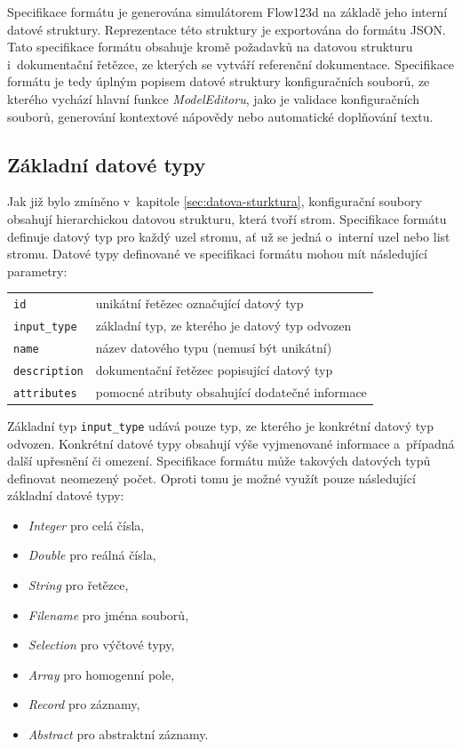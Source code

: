 \documentclass[FM,bw,DP]{tulthesis}
\begin{document}
Specifikace formátu je generována simulátorem Flow123d na základě jeho interní datové struktury. Reprezentace této struktury je exportována do formátu \gls{JSON}. Tato specifikace formátu obsahuje kromě požadavků na datovou strukturu i~dokumentační řetězce, ze kterých se vytváří referenční dokumentace. Specifikace formátu je tedy úplným popisem datové struktury konfiguračních souborů, ze kterého vychází hlavní funkce \textit{ModelEditoru}, jako je validace konfiguračních souborů, generování kontextové nápovědy nebo automatické doplňování textu.

\subsection{Základní datové typy}
\label{sec:analyza-specifikace-formatu-zakladni-datove-typy}
Jak již bylo zmíněno v~kapitole \ref{sec:datova-sturktura}, konfigurační soubory obsahují hierarchickou datovou strukturu, která tvoří strom. Specifikace formátu definuje datový typ pro každý uzel stromu, ať už se jedná o~interní uzel nebo list stromu. Datové typy definované ve specifikaci formátu mohou mít následující parametry:

\vspace{0.5cm}
\begin{tabular}{m{3cm}@{}l}
\texttt{id}\dotfill & unikátní řetězec označující datový typ \\
\texttt{input\_type}\dotfill & základní typ, ze kterého je datový typ odvozen  \\
\texttt{name}\dotfill & název datového typu (nemusí být unikátní) \\
\texttt{description}\dotfill & dokumentační řetězec popisující datový typ \\
\texttt{attributes}\dotfill & pomocné atributy obsahující dodatečné informace \\
\end{tabular}
\vspace{0.5cm}

Základní typ \texttt{input\_type} udává pouze typ, ze kterého je konkrétní datový typ odvozen. Konkrétní datové typy obsahují výše vyjmenované informace a~případná další upřesnění či omezení. Specifikace formátu může takových datových typů definovat neomezený počet. Oproti tomu je možné využít pouze následující základní datové typy:

\begin{itemize}[itemsep=2pt, topsep=12pt, partopsep=0pt]
\item \textit{Integer} pro celá čísla,
\item \textit{Double} pro reálná čísla,
\item \textit{String} pro řetězce,
\item \textit{Filename} pro jména souborů,
\item \textit{Selection} pro výčtové typy,
\item \textit{Array} pro homogenní pole,
\item \textit{Record} pro záznamy,
\item \textit{Abstract} pro abstraktní záznamy.
\end{itemize}
\end{document}
